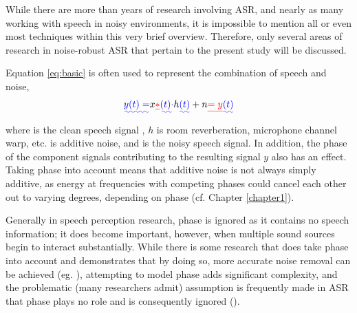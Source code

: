 While there are more than \DIFdelbegin {}\DIFdelend \DIFaddbegin {}\DIFaddend years of research involving ASR, and nearly as many working with speech in noisy environments, it is impossible to mention all or even most techniques within this very brief overview.  Therefore, %
 only several areas of research in noise-robust ASR that pertain to the present study will be discussed.

Equation \ref{eq:basic} is often used to represent the combination of speech and noise,
\begin{equation}\label{eq:basic}
\DIFaddbegin \DIFadd{y(t) = }\DIFaddend x\DIFdelbegin \DIFdel{* }\DIFdelend \DIFaddbegin \DIFadd{(t) \cdot }\DIFaddend h\DIFaddbegin \DIFadd{(t) }\DIFaddend + n\DIFdelbegin \DIFdel{= y
}\DIFdelend \DIFaddbegin \DIFadd{(t)
}\DIFaddend \end{equation}
where \DIFdelbegin {}\DIFdelend \DIFaddbegin {}\DIFaddend is the clean speech signal \DIFaddbegin {}\DIFaddend , $h$ is \DIFdelbegin {}\DIFdelend \DIFaddbegin {}\DIFaddend room reverberation, microphone channel warp, etc. \DIFdelbegin {}\DIFdelend \DIFaddbegin {}\DIFaddend is additive noise, and \DIFdelbegin {}\DIFdelend \DIFaddbegin {}\DIFaddend is the noisy speech signal\DIFaddbegin {}\DIFaddend .  In addition, the phase of the component signals contributing to the resulting signal $y$ also has an effect.  Taking phase into account means that additive noise is not always simply additive, as energy at frequencies with competing phases could cancel each other out to varying degrees, depending on phase (cf. Chapter \ref{chapter1}).  

Generally in speech perception research, phase is ignored as it contains no speech information; it does become important, however, when multiple sound sources begin to interact substantially. While there is some research that does take phase into account and demonstrates that by doing so, more accurate noise removal can be achieved (eg. \cite{deng:04,leutnant:09}), attempting to model phase adds significant complexity, and the problematic (many researchers admit) assumption is frequently made in ASR that phase plays no role and is consequently ignored (\cite{li:14}).  

